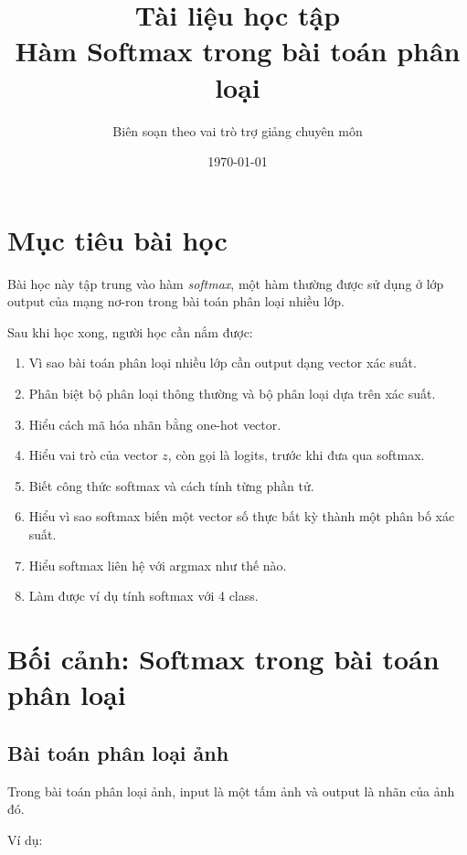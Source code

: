 \documentclass[12pt,a4paper]{report}
\title{
    \textbf{Tài liệu học tập}\\
    \large Hàm Softmax trong bài toán phân loại
}
\author{Biên soạn theo vai trò trợ giảng chuyên môn}
\date{\today}
\begin{document}
\maketitle
\tableofcontents
\newpage

\chapter*{Mục tiêu bài học}

Bài học này tập trung vào hàm \textit{softmax}, một hàm thường được sử dụng ở lớp output của mạng nơ-ron trong bài toán phân loại nhiều lớp.

Sau khi học xong, người học cần nắm được:

\begin{enumerate}[label=\arabic*.]
    \item Vì sao bài toán phân loại nhiều lớp cần output dạng vector xác suất.
    \item Phân biệt bộ phân loại thông thường và bộ phân loại dựa trên xác suất.
    \item Hiểu cách mã hóa nhãn bằng one-hot vector.
    \item Hiểu vai trò của vector $z$, còn gọi là logits, trước khi đưa qua softmax.
    \item Biết công thức softmax và cách tính từng phần tử.
    \item Hiểu vì sao softmax biến một vector số thực bất kỳ thành một phân bố xác suất.
    \item Hiểu softmax liên hệ với argmax như thế nào.
    \item Làm được ví dụ tính softmax với 4 class.
\end{enumerate}

\chapter{Bối cảnh: Softmax trong bài toán phân loại}

\section{Bài toán phân loại ảnh}

Trong bài toán phân loại ảnh, input là một tấm ảnh và output là nhãn của ảnh đó.

Ví dụ:
\end{document}
